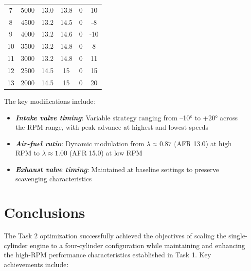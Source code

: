 \begin{table}[H]
\begin{tabular}{cccccc}
        7  & 5000 & \textcolor{baselinecolor}{13.0} & \textcolor{optimizedcolor}{13.8} & \textcolor{baselinecolor}{0} & \textcolor{optimizedcolor}{10} \\
        8  & 4500 & \textcolor{baselinecolor}{13.2} & \textcolor{optimizedcolor}{14.5} & \textcolor{baselinecolor}{0} & \textcolor{optimizedcolor}{-8} \\
        9  & 4000 & \textcolor{baselinecolor}{13.2} & \textcolor{optimizedcolor}{14.6} & \textcolor{baselinecolor}{0} & \textcolor{optimizedcolor}{-10} \\
        10 & 3500 & \textcolor{baselinecolor}{13.2} & \textcolor{optimizedcolor}{14.8} & \textcolor{baselinecolor}{0} & \textcolor{optimizedcolor}{8} \\
        11 & 3000 & \textcolor{baselinecolor}{13.2} & \textcolor{optimizedcolor}{14.8} & \textcolor{baselinecolor}{0} & \textcolor{optimizedcolor}{11} \\
        12 & 2500 & \textcolor{baselinecolor}{14.5} & \textcolor{optimizedcolor}{15} & \textcolor{baselinecolor}{0} & \textcolor{optimizedcolor}{15} \\
        13 & 2000 & \textcolor{baselinecolor}{14.5} & \textcolor{optimizedcolor}{15} & \textcolor{baselinecolor}{0} & \textcolor{optimizedcolor}{20} \\
        \bottomrule
    \end{tabular}
\end{table}

The key modifications include:
\begin{itemize}
    \item \textbf{\textit{Intake valve timing}}: Variable strategy ranging from --10° to +20° across the RPM range, with peak advance at highest and lowest speeds
    \item \textbf{\textit{Air-fuel ratio}}: Dynamic modulation from $\lambda \approx 0.87$ (AFR 13.0) at high RPM to $\lambda \approx 1.00$ (AFR 15.0) at low RPM
    \item \textbf{\textit{Exhaust valve timing}}: Maintained at baseline settings to preserve scavenging characteristics
\end{itemize}

\section{Conclusions}

The Task 2 optimization successfully achieved the objectives of scaling the single-cylinder engine to a four-cylinder configuration while maintaining and enhancing the high-RPM performance characteristics established in Task 1. Key achievements include:

